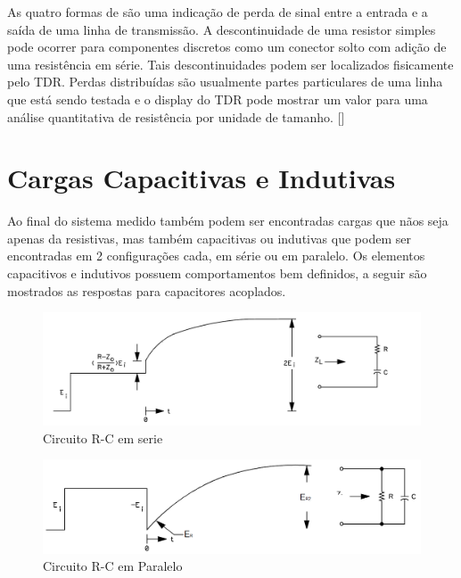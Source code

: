 As quatro formas de são uma indicação de perda de sinal entre a entrada e a saída de uma linha de transmissão. A descontinuidade de uma resistor simples pode ocorrer para componentes discretos como um conector solto com adição de uma resistência em série. Tais descontinuidades podem ser localizados fisicamente pelo TDR. Perdas distribuídas são usualmente partes particulares de uma linha que está sendo testada e o display do TDR pode mostrar um valor para uma análise quantitativa de resistência por unidade de tamanho. [\cite{TDK}]
\section{Cargas Capacitivas e Indutivas}

Ao final do sistema medido também podem ser encontradas cargas que nãos seja apenas da resistivas, mas também capacitivas ou indutivas que podem ser encontradas em 2 configurações cada, em série ou em paralelo. Os elementos capacitivos e indutivos possuem comportamentos bem definidos, a seguir são mostrados as respostas para capacitores acoplados.

\begin{figure}[htb!]
	\begin{center}
		\includegraphics[scale=.30]{./cap2/figuras/R-C_serie_response.png}
		\caption{Circuito R-C em serie}
		\label{fig:RC_serie}
	\end{center}
\end{figure}

\begin{figure}[htb!]
	\begin{center}
		\includegraphics[scale=.30]{./cap2/figuras/R-C_parallel_response.png}
		\caption{Circuito R-C em Paralelo}
		\label{fig:RC_paralelo}
	\end{center}
\end{figure}

